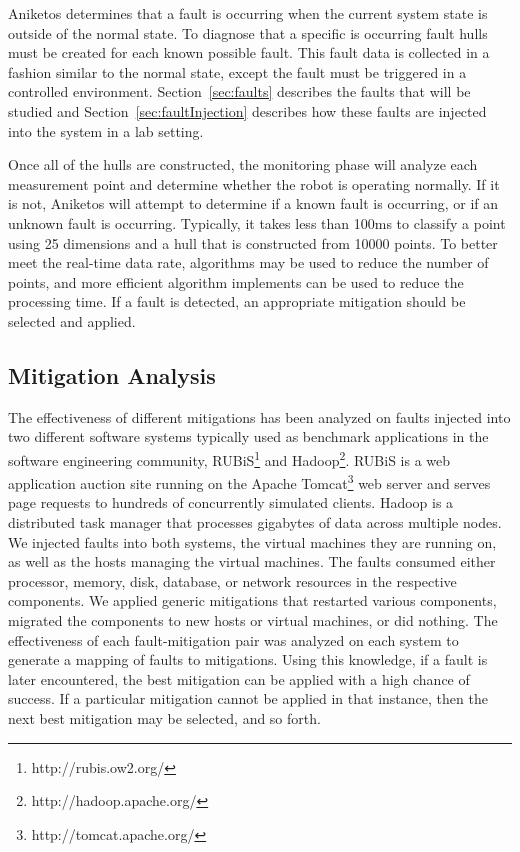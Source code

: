 Aniketos determines that a fault is occurring when the current system state is outside of the normal state. To diagnose that a specific is occurring fault hulls must be created for each known possible fault. This fault data is collected in a fashion similar to the normal state, except the fault must be triggered in a controlled environment. Section~\ref{sec:faults} describes the faults that will be studied and Section~\ref{sec:faultInjection} describes how these faults are injected into the system in a lab setting.

Once all of the hulls are constructed, the monitoring phase will analyze each measurement point and determine whether the robot is operating normally. If it is not, Aniketos will attempt to determine if a known fault is occurring, or if an unknown fault is occurring.  Typically, it takes less than 100ms to classify a point using 25 dimensions and a hull that is constructed from 10000 points. 
To better meet the real-time data rate, algorithms may be used to reduce the number of points, and more efficient algorithm implements can be used to reduce the processing time. If a fault is detected, an appropriate mitigation should be selected and applied.

\subsection{Mitigation Analysis}
\label{sub:mitigationanalysis}
The effectiveness of different mitigations has been analyzed on faults injected into two different software systems typically used as benchmark applications in the software engineering community, RUBiS\footnote{http://rubis.ow2.org/} and Hadoop\footnote{http://hadoop.apache.org/}. RUBiS is a web application auction site running on the Apache Tomcat\footnote{http://tomcat.apache.org/} web server and serves page requests to hundreds of concurrently simulated clients. Hadoop is a distributed task manager that processes gigabytes of data across multiple nodes. We injected faults into both systems, the virtual machines they are running on, as well as the hosts managing the virtual machines. The faults consumed either processor, memory, disk, database, or network resources in the respective components. We applied generic mitigations that restarted various components, migrated the components to new hosts or virtual machines, or did nothing. The effectiveness of each fault-mitigation pair was analyzed on each system to generate a mapping of faults to mitigations. Using this knowledge, if a fault is later encountered, the best mitigation can be applied with a high chance of success. If a particular mitigation cannot be applied in that instance, then the next best mitigation may be selected, and so forth.


